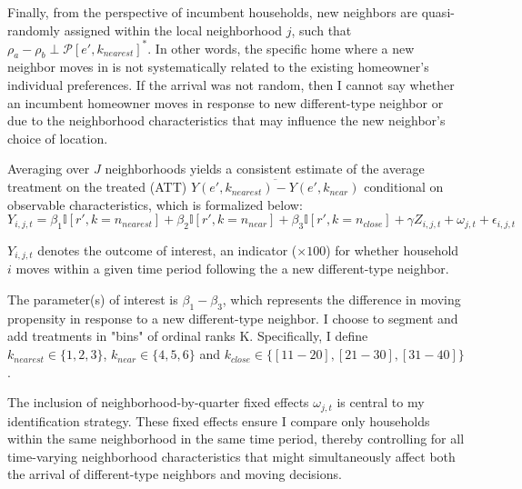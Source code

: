 \documentclass[../main.tex]{subfiles}
\begin{document}
Finally, from the perspective of incumbent households, new neighbors are quasi-randomly assigned within the local neighborhood $j$, such that $\rho_a - \rho_b \perp \mathcal{P}[e', k_{nearest}]^*$. In other words, the specific home where a new neighbor moves in is not systematically related to the existing homeowner's individual preferences. If the arrival was not random, then I cannot say whether an incumbent homeowner moves in response to new different-type neighbor or due to the neighborhood characteristics that may influence the new neighbor's choice of location. 

Averaging over $J$ neighborhoods yields a consistent estimate of the average treatment on the treated (ATT) $\overline{Y(e', k_{nearest}) - Y(e', k_{near})}$ conditional on observable characteristics, which is formalized below: 
\begin{equation}
    Y_{i, j, t} = \beta_1 \mathbb{I}[r', k=n_{nearest}] + \beta_2 \mathbb{I}[r', k = n_{near}] + \beta_3 \mathbb{I}[r', k = n_{close}]  + \gamma Z_{i, j, t} + \omega_{j, t} + \epsilon_{i, j, t}
    \label{eq:main_eq_schelling_behavior}
\end{equation}

$Y_{i, j, t}$ denotes the outcome of interest, an indicator ($\times100$) for whether household $i$ moves within a given time period following the a new different-type neighbor. 

The parameter(s) of interest is $\beta_1 - \beta_3$, which represents the difference in moving propensity in response to a new different-type neighbor. I choose to segment and add treatments in "bins" of ordinal ranks K. Specifically, I define $k_{nearest} \in \{1, 2, 3\}$, $k_{near} \in \{4, 5, 6\}$ and $k_{close} \in \{[11-20], [21-30], [31-40]\}$.



The inclusion of neighborhood-by-quarter fixed effects $\omega_{j,t}$ is central to my identification strategy. These fixed effects ensure I compare only households within the same neighborhood in the same time period, thereby controlling for all time-varying neighborhood characteristics that might simultaneously affect both the arrival of different-type neighbors and moving decisions. 
\end{document}
